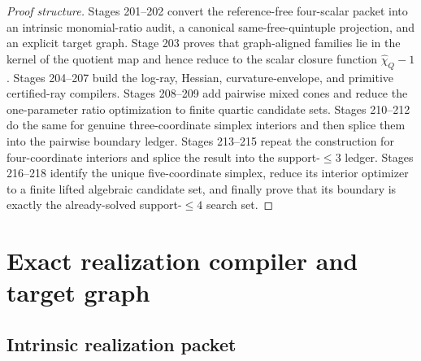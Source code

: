 \begin{proof}[Proof structure]
Stages 201--202 convert the reference-free four-scalar packet into an intrinsic monomial-ratio audit, a canonical same-free-quintuple projection, and an explicit target graph.  Stage 203 proves that graph-aligned families lie in the kernel of the quotient map and hence reduce to the scalar closure function \(\widehat\chi_Q-1\).  Stages 204--207 build the log-ray, Hessian, curvature-envelope, and primitive certified-ray compilers.  Stages 208--209 add pairwise mixed cones and reduce the one-parameter ratio optimization to finite quartic candidate sets.  Stages 210--212 do the same for genuine three-coordinate simplex interiors and then splice them into the pairwise boundary ledger.  Stages 213--215 repeat the construction for four-coordinate interiors and splice the result into the support-\(\le3\) ledger.  Stages 216--218 identify the unique five-coordinate simplex, reduce its interior optimizer to a finite lifted algebraic candidate set, and finally prove that its boundary is exactly the already-solved support-\(\le4\) search set.
\end{proof}

\section{Exact realization compiler and target graph}
\label{sec:part06-realization-compiler-and-target-graph}

\subsection{Intrinsic realization packet}
\label{subsec:part06-intrinsic-realization-packet}

